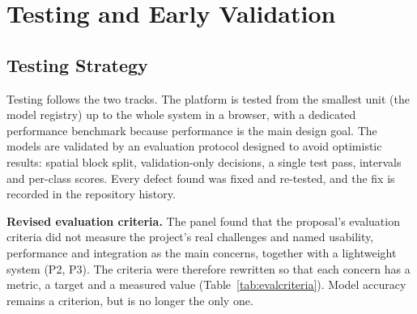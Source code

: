 \chapter{Testing and Early Validation}

\section{Testing Strategy}
Testing follows the two tracks. The platform is tested from the smallest unit (the model registry)
up to the whole system in a browser, with a dedicated performance benchmark because performance is
the main design goal. The models are validated by an evaluation protocol designed to avoid
optimistic results: spatial block split, validation-only decisions, a single test pass, intervals
and per-class scores. Every defect found was fixed and re-tested, and the fix is recorded in the
repository history.

\textbf{Revised evaluation criteria.} The panel found that the proposal's evaluation criteria did not
measure the project's real challenges and named usability, performance and integration as the main
concerns, together with a lightweight system (P2, P3). The criteria were therefore rewritten so that
each concern has a metric, a target and a measured value (Table~\ref{tab:evalcriteria}). Model
accuracy remains a criterion, but is no longer the only one.

